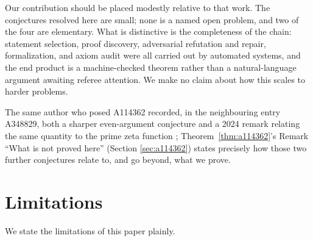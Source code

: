 \documentclass[11pt]{article}
\theoremstyle{plain}
\theoremstyle{definition}
\theoremstyle{remark}
\numberwithin{equation}{section}
\begin{document}
Our contribution should be placed modestly relative to that work. The conjectures resolved here
are small; none is a named open problem, and two of the four are elementary. What is
distinctive is the completeness of the chain: statement selection, proof discovery, adversarial
refutation and repair, formalization, and axiom audit were all carried out by automated systems,
and the end product is a machine-checked theorem rather than a natural-language argument
awaiting referee attention. We make no claim about how this scales to harder problems.

The same author who posed A114362 recorded, in the neighbouring entry A348829, both a sharper
even-argument conjecture and a 2024 remark relating the same quantity to the prime zeta function
\cite{ordowski}; Theorem~\ref{thm:a114362}'s Remark ``What is not proved here'' (Section
\ref{sec:a114362}) states precisely how those two further conjectures relate to, and go beyond,
what we prove.

\section{Limitations}

We state the limitations of this paper plainly.
\end{document}
